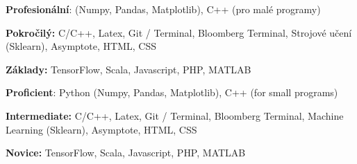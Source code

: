 \ifczech

 \textbf{Profesionální}: (Numpy, Pandas, Matplotlib), C++ (pro malé programy) \par
{} \textbf{Pokročilý:} C/C++, Latex, Git / Terminal, Bloomberg Terminal, Strojové učení (Sklearn), Asymptote, HTML, CSS \par
{} \textbf{Základy:} TensorFlow, Scala, Javascript, PHP, MATLAB \par

\else

 \textbf{Proficient}: Python (Numpy, Pandas, Matplotlib), C++ (for small programs) \par
{} \textbf{Intermediate:} C/C++, Latex, Git / Terminal, Bloomberg Terminal, Machine Learning (Sklearn), Asymptote, HTML, CSS \par
{} \textbf{Novice:} TensorFlow, Scala, Javascript, PHP, MATLAB \par

\fi